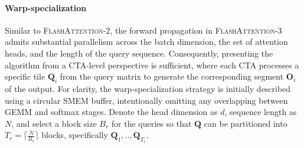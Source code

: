 \paragraph{Warp-specialization}
Similar to \textsc{FlashAttention-2}, the forward propagation in \textsc{FlashAttention-3} admits substantial parallelism across the batch dimension, the set of attention heads, and the length of the query sequence. Consequently, presenting the algorithm from a CTA-level perspective is sufficient, where each CTA processes a specific tile $\mathbf{Q}_i$ from the query matrix to generate the corresponding segment $\mathbf{O}_i$ of the output. For clarity, the warp-specialization strategy is initially described using a circular SMEM buffer, intentionally omitting any overlapping between GEMM and softmax stages. Denote the head dimension as $d$, sequence length as $N$, and select a block size $B_r$ for the queries so that $\mathbf{Q}$ can be partitioned into $T_r = \lceil \frac{N}{B_r} \rceil$ blocks, specifically $\mathbf{Q}_1, .., \mathbf{Q}_{T_r}$.

